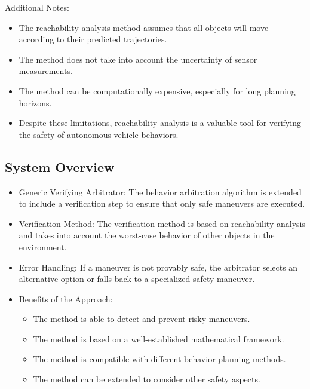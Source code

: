 Additional Notes:

\begin{itemize}
    \item The reachability analysis method assumes that all objects will move according to their predicted trajectories.
    \item The method does not take into account the uncertainty of sensor measurements.
    \item The method can be computationally expensive, especially for long planning horizons.
    \item Despite these limitations, reachability analysis is a valuable tool for verifying the safety of autonomous vehicle behaviors.
\end{itemize}

\subsection{System Overview}

\begin{itemize}
\item Generic Verifying Arbitrator: The behavior arbitration algorithm is extended to include a verification step to ensure that only safe maneuvers are executed.
\item Verification Method: The verification method is based on reachability analysis and takes into account the worst-case behavior of other objects in the environment.
\item Error Handling: If a maneuver is not provably safe, the arbitrator selects an alternative option or falls back to a specialized safety maneuver.
\item Benefits of the Approach:

\begin{itemize}
    \item The method is able to detect and prevent risky maneuvers.
    \item The method is based on a well-established mathematical framework.
    \item The method is compatible with different behavior planning methods.
    \item The method can be extended to consider other safety aspects.
\end{itemize}

\end{itemize}
